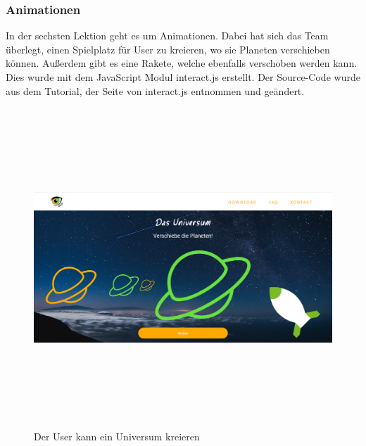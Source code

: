 \subsubsection{Animationen}
In der sechsten Lektion geht es um Animationen. Dabei hat sich das Team überlegt, einen Spielplatz für User zu kreieren, wo sie Planeten verschieben können. Außerdem gibt es eine Rakete, welche ebenfalls verschoben werden kann. Dies wurde mit dem JavaScript Modul interact.js erstellt. Der Source-Code wurde aus dem Tutorial, der Seite von interact.js entnommen und geändert. 
\begin{figure}[h]
	\centering
\includegraphics[width=12cm,height=12cm,keepaspectratio]{webseite_universum} 
	\caption{Der User kann ein Universum kreieren}
\end{figure}
